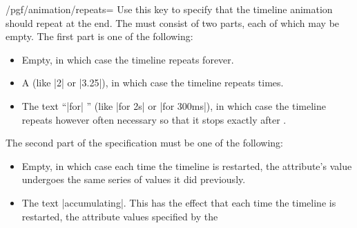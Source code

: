\begin{key}{/pgf/animation/repeats=}
    Use this key to specify that the timeline animation should repeat at the
    end. The  must consist of two parts, each of which may
    be empty. The first part is one of the following:
    \begin{itemize}
        \item Empty, in which case the timeline repeats forever.
\begin{codeexample}[animation list={1,2,3,4,5}]
\end{codeexample}
        \item A  (like |2| or |3.25|), in which case the timeline
            repeats  times.
\begin{codeexample}[animation list={1,2,3,4,5}]
\end{codeexample}
        \item The text ``|for| '' (like |for 2s| or |for 300ms|), in
            which case the timeline repeats however often necessary so that it
            stops exactly after .
\begin{codeexample}[animation list={1,2,3,4,5}]
\end{codeexample}
    \end{itemize}
    The second part of the specification must be one of the following:
    \begin{itemize}
        \item Empty, in which case each time the timeline is restarted, the
            attribute's value undergoes the same series of values it did
            previously.
        \item The text |accumulating|. This has the effect that each time the
            timeline is restarted, the attribute values specified by the

\end{itemize}
\end{key}
